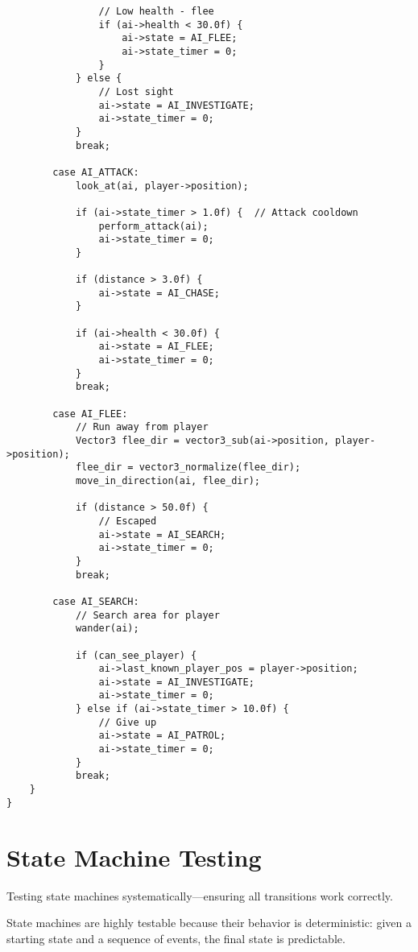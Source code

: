 \begin{lstlisting}
                // Low health - flee
                if (ai->health < 30.0f) {
                    ai->state = AI_FLEE;
                    ai->state_timer = 0;
                }
            } else {
                // Lost sight
                ai->state = AI_INVESTIGATE;
                ai->state_timer = 0;
            }
            break;

        case AI_ATTACK:
            look_at(ai, player->position);

            if (ai->state_timer > 1.0f) {  // Attack cooldown
                perform_attack(ai);
                ai->state_timer = 0;
            }

            if (distance > 3.0f) {
                ai->state = AI_CHASE;
            }

            if (ai->health < 30.0f) {
                ai->state = AI_FLEE;
                ai->state_timer = 0;
            }
            break;

        case AI_FLEE:
            // Run away from player
            Vector3 flee_dir = vector3_sub(ai->position, player->position);
            flee_dir = vector3_normalize(flee_dir);
            move_in_direction(ai, flee_dir);

            if (distance > 50.0f) {
                // Escaped
                ai->state = AI_SEARCH;
                ai->state_timer = 0;
            }
            break;

        case AI_SEARCH:
            // Search area for player
            wander(ai);

            if (can_see_player) {
                ai->last_known_player_pos = player->position;
                ai->state = AI_INVESTIGATE;
                ai->state_timer = 0;
            } else if (ai->state_timer > 10.0f) {
                // Give up
                ai->state = AI_PATROL;
                ai->state_timer = 0;
            }
            break;
    }
}
\end{lstlisting}

\section{State Machine Testing}

Testing state machines systematically—ensuring all transitions work correctly.

State machines are highly testable because their behavior is deterministic: given a starting state and a sequence of events, the final state is predictable.

